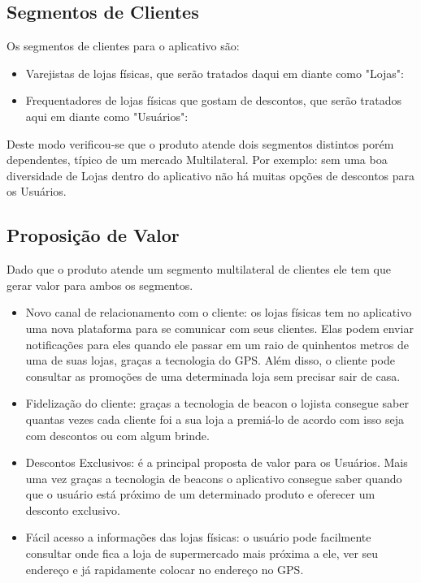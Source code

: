 \subsection{Segmentos de Clientes}
\label{cha:segmentos_de_clientes}
Os segmentos de clientes para o aplicativo são:
\begin{itemize}
\item Varejistas de lojas físicas, que serão tratados daqui em diante como "Lojas": 
\item Frequentadores de lojas físicas que gostam de descontos, que serão tratados aqui em diante como "Usuários": 
\end{itemize}
Deste modo verificou-se que o produto atende dois segmentos distintos porém dependentes, típico de um mercado Multilateral. Por exemplo: sem uma boa diversidade de Lojas dentro do aplicativo não há muitas opções de descontos para os Usuários.

\subsection{Proposição de Valor}
\label{cha:proposicao_de_valor}
Dado que o produto atende um segmento multilateral de clientes ele tem que gerar valor para ambos os segmentos.
\begin{itemize}
\item Novo canal de relacionamento com o cliente: os lojas físicas tem no aplicativo uma nova plataforma para se comunicar com seus clientes. Elas podem enviar notificações para eles quando ele passar em um raio de quinhentos metros de uma de suas lojas, graças a tecnologia do GPS. Além disso, o cliente pode consultar as promoções de uma determinada loja sem precisar sair de casa.
\item Fidelização do cliente: graças a tecnologia de beacon o lojista consegue saber quantas vezes cada cliente foi a sua loja a premiá-lo de acordo com isso seja com descontos ou com algum brinde.
\item Descontos Exclusivos: é a principal proposta de valor para os Usuários. Mais uma vez graças a tecnologia de beacons o aplicativo consegue saber quando que o usuário está próximo de um determinado produto e oferecer um desconto exclusivo.
\item Fácil acesso a informações das lojas físicas: o usuário pode facilmente consultar onde fica a loja de supermercado mais próxima a ele, ver seu endereço e já rapidamente colocar no endereço no GPS.
\end{itemize}

